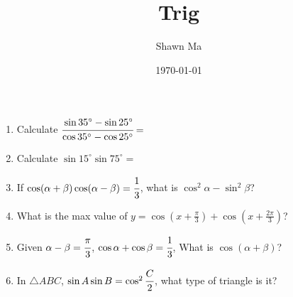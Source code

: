 \documentclass[letterpaper,11pt]{article}
\author{Shawn Ma}
\date{\today}
\title{Trig}
\begin{document}
\setlength{\parindent}{0pt}

\begin{enumerate}
\item Calculate $\cfrac{\sin 35^\circ-\sin25^\circ}{\cos 35^\circ-\cos25^\circ}=$\vspace{3cm}
\item Calculate $\sin 15^\circ \sin75^\circ=$\vspace{3cm}
\item If $\cos(\alpha+\beta)\cos(\alpha-\beta)=\cfrac{1}{3}$, what is $\cos^2\alpha-\sin^2\beta$?\vspace{3cm}
\item What is the max value of $y=\cos\left(x+\frac{\pi}{3}\right)+\cos\left(x+\frac{2\pi}{3}\right)$?\vspace{3cm}
\item Given $\alpha-\beta=\cfrac{\pi}{3}$, $\cos\alpha+\cos\beta=\cfrac{1}{3}$, What is $\cos(\alpha+\beta)$?\vspace{3cm}
\item In $\triangle{ABC}$, $\sin A\sin B=\cos^2\cfrac{C}{2}$, what type of triangle is it?
\end{enumerate}
\end{document}
